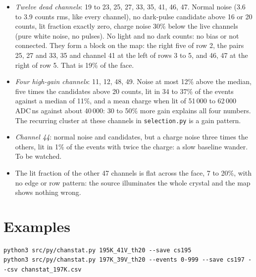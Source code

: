 \documentclass[11pt]{article}
\newcommand{\code}[1]{\texttt{#1}}
\begin{document}
\begin{itemize}
\item \emph{Twelve dead channels}: 19 to 23, 25, 27, 33, 35, 41, 46, 47.
  Normal noise (3.6 to 3.9 counts rms, like every channel), no dark-pulse
  candidate above 16 or 20 counts, lit fraction exactly zero, charge noise
  30\% below the live channels (pure white noise, no pulses). No light
  and no dark counts: no bias or not connected. They form a block on the
  map: the right five of row 2, the pairs 25, 27 and 33, 35 and channel
  41 at the left of rows 3 to 5, and 46, 47 at the right of row 5. That is
  19\% of the face.
\item \emph{Four high-gain channels}: 11, 12, 48, 49. Noise at most 12\%
  above the median, five times the candidates above 20 counts, lit in 34
  to 37\% of the events against a median of 11\%, and a mean charge when
  lit of 51\,000 to 62\,000 ADC\,ns against about 40\,000: 30 to 50\%
  more gain explains all four numbers. The recurring cluster at these
  channels in \code{selection.py} is a gain pattern.
\item \emph{Channel 44}: normal noise and candidates, but a charge noise
  three times the others, lit in 1\% of the events with twice the charge:
  a slow baseline wander. To be watched.
\item The lit fraction of the other 47 channels is flat across the face,
  7 to 20\%, with no edge or row pattern: the source illuminates the
  whole crystal and the map shows nothing wrong.
\end{itemize}

\section{Examples}

\begin{lstlisting}
python3 src/py/chanstat.py 195K_41V_th20 --save cs195
python3 src/py/chanstat.py 197K_39V_th20 --events 0-999 --save cs197 --csv chanstat_197K.csv
\end{lstlisting}
\end{document}
